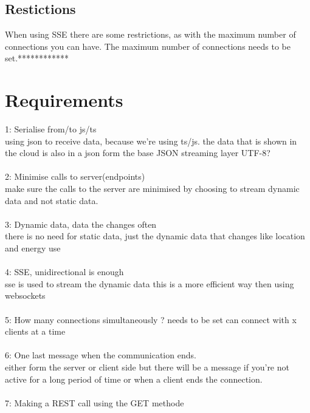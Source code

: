 \documentclass{article}
\begin{document}
\subsection{Restictions}\label{restrictions}
When using SSE there are some restrictions, as with the maximum number of connections you can have. The maximum number of connections needs to be set.************
\section{Requirements}\label{sec:requirements}
1: Serialise from/to js/ts\\
using json to receive data, because we're using ts/js.
the data that is shown in the cloud is also in a json form 
the base JSON streaming layer 
UTF-8?\\
\\
2: Minimise calls to server(endpoints)\\
make sure the calls to the server are minimised by choosing to stream dynamic data and not static data.\\
\\
3: Dynamic data, data the changes often\\
there is no need for static data, just the dynamic data that changes like location and energy use \\
\\
4: SSE, unidirectional is enough\\
sse is used to stream the dynamic data this is a more efficient way then using websockets\\
\\
5: How many connections simultaneously ? needs to be set
can connect with x clients at a time\\
\\
6: One last message when the communication ends. \\
either form the server or client side but there will be a message if you're not active for a long period of time or when a client ends the connection. \\
\\
7: Making a REST call using the GET methode
\end{document}
